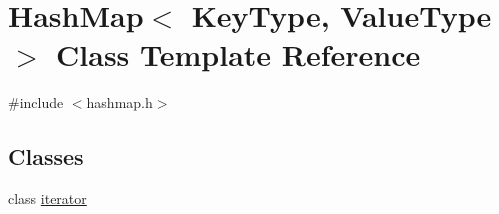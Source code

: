 \hypertarget{classHashMap}{}\section{Hash\+Map$<$ Key\+Type, Value\+Type $>$ Class Template Reference}
\label{classHashMap}


{\ttfamily \#include $<$hashmap.\+h$>$}

\subsection*{Classes}
\begin{DoxyCompactItemize}
\item 
class \mbox{\hyperlink{classHashMap_1_1iterator}{iterator}}
\end{DoxyCompactItemize}
